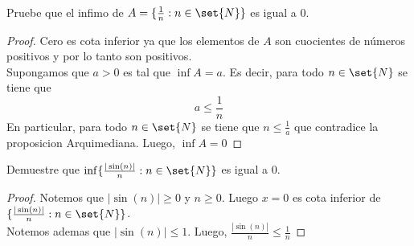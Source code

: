 \documentclass[11pt]{book}
\begin{document}
\begin{ejm}
	Pruebe que el infimo de $A=\{\frac{1}{n}:n\in\set{N}\}$ es igual a $0$.
\end{ejm}
\begin{proof}
	Cero es cota inferior ya que los elementos de $A$ son cuocientes de números positivos y por lo tanto son positivos.\\
	Supongamos que $a>0$ es tal que $\inf A=a$. Es decir, para todo $n\in\set{N}$ se tiene que
	\[a\leq\frac{1}{n}\]
	En particular, para todo $n\in\set{N}$ se tiene que $n\leq\frac{1}{a}$ que contradice la proposicion Arquimediana. Luego, $\inf A=0$
\end{proof}

\begin{ejm}
	Demuestre que $\inf\{\frac{|\sin(n)|}{n}:n\in\set{N}\}$ es igual a $0$.
\end{ejm}

\begin{proof}
	Notemos que $|\sin(n)|\geq 0$ y $n\geq0$. Luego $x=0$ es cota inferior de $\{\frac{|\sin(n)|}{n}:n\in\set{N}\}$.\\
	Notemos ademas que $|\sin(n)|\leq 1$. Luego, $\frac{|\sin(n)|}{n}\leq\frac{1}{n}$
\end{proof}
\end{document}
